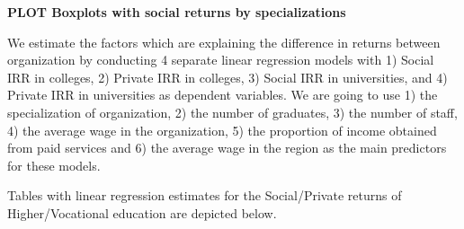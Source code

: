 \documentclass[alpha-refs]{wiley-article-05g}
\begin{document}
\textbf{PLOT Boxplots with social returns by specializations}

We estimate the factors which are explaining the difference in returns between organization by conducting 4 separate linear regression models with 1) Social IRR in colleges, 2) Private IRR in colleges, 3) Social IRR in universities, and 4) Private IRR in universities as dependent variables. We are going to use 1) the specialization of organization, 2) the number of graduates, 3) the number of staff, 4) the average wage in the organization, 5) the proportion of income obtained from paid services and 6) the average wage in the region as the main predictors for these models.

Tables with linear regression estimates for the Social/Private returns of Higher/Vocational education are depicted below.
\end{document}
